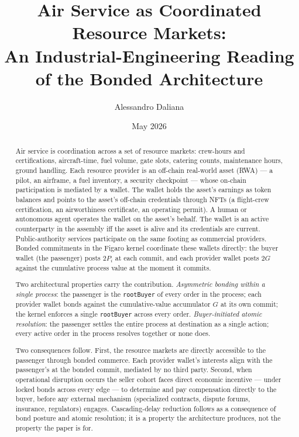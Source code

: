 \documentclass[11pt,a4paper]{article}
\title{%
  Air Service as Coordinated Resource Markets:\\
  An Industrial-Engineering Reading of the Bonded Architecture%
}
\author{
  Alessandro Daliana
}
\date{May 2026}
\theoremstyle{definition}
\theoremstyle{remark}
\begin{document}
\maketitle

\begin{abstract}
Air service is coordination across a set of resource markets:
crew-hours and certifications, aircraft-time, fuel volume, gate
slots, catering counts, maintenance hours, ground handling.
Each resource provider is an off-chain real-world asset (RWA)
--- a pilot, an airframe, a fuel inventory, a security
checkpoint --- whose on-chain participation is mediated by a
wallet. The wallet holds the asset's earnings as token balances
and points to the asset's off-chain credentials through NFTs (a
flight-crew certification, an airworthiness certificate, an
operating permit). A human or autonomous agent operates the
wallet on the asset's behalf. The wallet is an active counterparty
in the assembly iff the asset is alive and its credentials are
current. Public-authority services participate on the same
footing as commercial providers. Bonded commitments
in the Figaro kernel coordinate these wallets directly: the
buyer wallet (the passenger) posts $2P_i$ at each commit, and
each provider wallet posts $2G$ against the cumulative process
value at the moment it commits.

Two architectural properties carry the contribution.
\emph{Asymmetric bonding within a single process}: the passenger
is the \texttt{rootBuyer} of every order in the process; each
provider wallet bonds against the cumulative-value accumulator
$G$ at its own commit; the kernel enforces a single
\texttt{rootBuyer} across every order. \emph{Buyer-initiated
atomic resolution}: the passenger settles the entire process at
destination as a single action; every active order in the process
resolves together or none does.

Two consequences follow. First, the resource markets are
directly accessible to the passenger through bonded commerce.
Each provider wallet's interests align with the passenger's at
the bonded commit, mediated by no third party. Second, when
operational disruption occurs the seller cohort faces direct
economic incentive --- under locked bonds across every edge --- to
determine and pay compensation directly to the buyer, before any
external mechanism (specialized contracts, dispute forums,
insurance, regulators) engages. Cascading-delay reduction
follows as a consequence of bond posture and atomic resolution;
it is a property the architecture produces, not the property the
paper is for.
\end{abstract}
\end{document}
